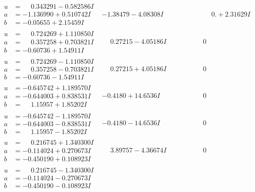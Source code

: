 \documentclass[1p]{elsarticle_modified}
\theoremstyle{definition}
\begin{document}
$$\begin{array}{c|c|c}
\begin{aligned}
u &= \phantom{-}0.343291 - 0.582586 I \\
a &= -1.136990 + 0.510742 I \\
b &= -0.05655 + 2.15459 I\end{aligned}
 & -1.38479 - 4.08308 I & \phantom{-0.000000 -}0. + 2.31629 I \\ \hline\begin{aligned}
u &= \phantom{-}0.724269 + 1.110850 I \\
a &= \phantom{-}0.357258 + 0.703821 I \\
b &= -0.60736 + 1.54911 I\end{aligned}
 & \phantom{-}0.27215 - 4.05186 I & \phantom{-0.000000 } 0 \\ \hline\begin{aligned}
u &= \phantom{-}0.724269 - 1.110850 I \\
a &= \phantom{-}0.357258 - 0.703821 I \\
b &= -0.60736 - 1.54911 I\end{aligned}
 & \phantom{-}0.27215 + 4.05186 I & \phantom{-0.000000 } 0 \\ \hline\begin{aligned}
u &= -0.645742 + 1.189570 I \\
a &= -0.644003 + 0.838531 I \\
b &= \phantom{-}1.15957 + 1.85202 I\end{aligned}
 & -0.4180 + 14.6536 I & \phantom{-0.000000 } 0 \\ \hline\begin{aligned}
u &= -0.645742 - 1.189570 I \\
a &= -0.644003 - 0.838531 I \\
b &= \phantom{-}1.15957 - 1.85202 I\end{aligned}
 & -0.4180 - 14.6536 I & \phantom{-0.000000 } 0 \\ \hline\begin{aligned}
u &= \phantom{-}0.216745 + 1.340300 I \\
a &= -0.114024 + 0.270673 I \\
b &= -0.450190 + 0.108923 I\end{aligned}
 & \phantom{-}3.89757 - 4.36674 I & \phantom{-0.000000 } 0 \\ \hline\begin{aligned}
u &= \phantom{-}0.216745 - 1.340300 I \\
a &= -0.114024 - 0.270673 I \\
b &= -0.450190 - 0.108923 I\end{aligned}

\end{array}$$
\end{document}
